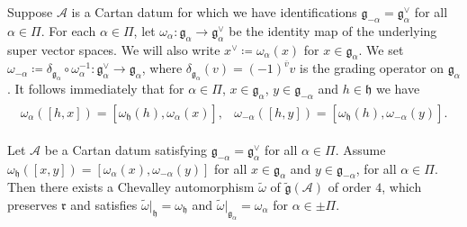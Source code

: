 \documentclass[12pt, a4paper, reqno]{amsart}
\def\ol{\overline}
\theoremstyle{definition}
\theoremstyle{definition}
\theoremstyle{definition}
\numberwithin{theorem}{section}
\numberwithin{lemma}{section}
\numberwithin{remark}{section}
\numberwithin{definition}{section}
\numberwithin{corollary}{section}
\numberwithin{proposition}{section}
\numberwithin{example}{section}
\begin{document}
	Suppose \(\mathcal{A}\) is a Cartan datum for which we have identifications \(\mathfrak{g}_{-\alpha}=\mathfrak{g}_{\alpha}^\vee\) for all \(\alpha \in \Pi\). For each $\alpha\in\Pi$, let \(\omega_{\alpha}:\mathfrak{g}_{\alpha}\rightarrow \mathfrak{g}_{\alpha}^\vee\) be the identity map of the underlying super vector spaces. We will also write \(x^\vee \coloneq \omega_{\alpha}(x)\) for \(x \in \mathfrak{g}_{\alpha}\). We set \(\omega_{-\alpha} \coloneq \delta_{\mathfrak{g}_{\alpha}}\circ\omega_{\alpha}^{-1}:\mathfrak{g}_{\alpha}^\vee \rightarrow \mathfrak{g}_{\alpha}\), where \(\delta_{\mathfrak{g}_{\alpha}}(v)=(-1)^{\ol{v}}v\) is the grading operator on \(\mathfrak{g}_{\alpha}\). It follows immediately that for \(\alpha\in \Pi\), \(x \in \mathfrak{g}_{\alpha}\), \(y \in \mathfrak{g}_{-\alpha}\) and \(h \in \mathfrak{h}\) we have
	\begin{align*}
		\begin{array}{cc}
			\omega_{\alpha}([h,x]) = [\omega_{\mathfrak{h}}(h),\omega_{\alpha}(x)], & \omega_{-\alpha}([h,y]) = [\omega_{\mathfrak{h}}(h),\omega_{-\alpha}(y)].
		\end{array}
	\end{align*}
	\begin{theorem}\label{theorem-half-baked-Chevalley}
		Let \(\mathcal{A}\) be a Cartan datum satisfying \(\mathfrak{g}_{-\alpha}=\mathfrak{g}_{\alpha}^\vee\) for all \(\alpha \in \Pi\). Assume \(\omega_{\mathfrak{h}}([x,y]) = [\omega_{\alpha}(x),\omega_{-\alpha}(y)]\) for all \(x\in \mathfrak{g}_{\alpha}\) and \(y \in \mathfrak{g}_{-\alpha}\), for all \(\alpha \in \Pi\). Then there exists a Chevalley automorphism \(\tilde{\omega}\) of \(\tilde{\mathfrak{g}}(\mathcal{A})\) of order \(4\), which preserves \(\mathfrak{r}\) and satisfies \(\tilde{\omega}|_{\mathfrak{h}} = \omega_{\mathfrak{h}}\) and \(\tilde{\omega}|_{\mathfrak{g}_{\alpha}} = \omega_{\alpha}\) for \(\alpha \in \pm \Pi\).
	\end{theorem}
	
\end{document}
